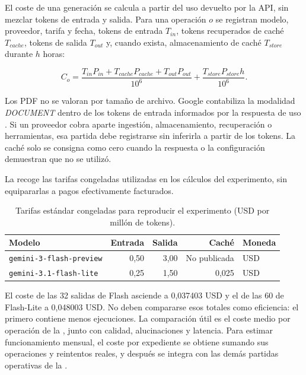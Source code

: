 El coste de una generación se calcula a partir del uso devuelto por la API, sin
mezclar tokens de entrada y salida. Para una operación $o$ se registran modelo,
proveedor, tarifa y fecha, tokens de entrada $T_{in}$, tokens recuperados de
caché $T_{cache}$, tokens de salida $T_{out}$ y, cuando exista, almacenamiento
de caché $T_{store}$ durante $h$ horas:

\begin{equation}
  C_o = \frac{T_{in} P_{in} + T_{cache} P_{cache} +
  T_{out} P_{out}}{10^6} + \frac{T_{store} P_{store} h}{10^6}.
\end{equation}

Los PDF no se valoran por tamaño de archivo. Google contabiliza la modalidad
\emph{DOCUMENT} dentro de los tokens de entrada informados por la respuesta de
uso \cite{googleGeminiPricing2026}. Si un proveedor cobra aparte ingestión,
almacenamiento, recuperación o herramientas, esa partida debe registrarse sin
inferirla a partir de los tokens. La caché solo se consigna como cero cuando la
respuesta o la configuración demuestran que no se utilizó.

La  recoge las tarifas congeladas utilizadas en los
cálculos del experimento, sin equipararlas a pagos efectivamente facturados.

\begin{table}[H]
  \centering
  \small
  \caption{Tarifas estándar congeladas para reproducir el experimento
  (USD por millón de tokens).}
  \label{tab:ai-model-pricing}
  \begin{tabular}{@{}lrrrl@{}}
    \toprule
    \textbf{Modelo} & \textbf{Entrada} & \textbf{Salida} & \textbf{Caché} & \textbf{Moneda} \\
    \midrule
    \texttt{gemini-3-flash-preview} & 0,50 & 3,00 & No publicada & USD \\
    \texttt{gemini-3.1-flash-lite} & 0,25 & 1,50 & 0,025 & USD \\
    \bottomrule
  \end{tabular}
\end{table}

El coste de las 32 salidas de Flash asciende a 0,037403 USD y el de las 60 de
Flash-Lite a 0,048003 USD. No deben compararse esos totales como eficiencia: el
primero contiene menos ejecuciones. La comparación útil es el coste medio por
operación de la , junto con calidad,
alucinaciones y latencia. Para estimar funcionamiento mensual, el coste por
expediente se obtiene sumando sus operaciones y reintentos reales, y después se
integra con las demás partidas operativas de la .

